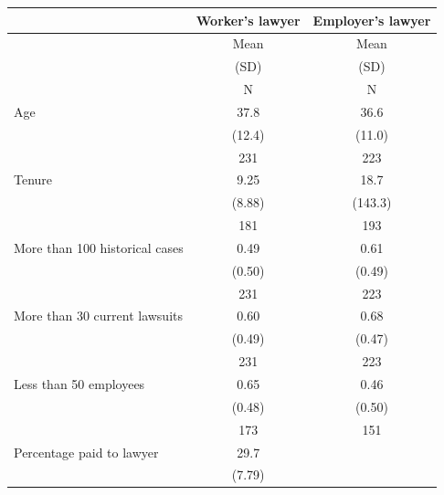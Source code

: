 \begin{tabular}{rrcccc}
\midrule
      &       & \multicolumn{2}{c}{Worker's lawyer} & \multicolumn{2}{c}{Employer's lawyer} \\
\midrule
      &       & \multicolumn{2}{c}{Mean} & \multicolumn{2}{c}{Mean} \\
      &       & \multicolumn{2}{c}{(SD)} & \multicolumn{2}{c}{(SD)} \\
\multicolumn{2}{r}{} & \multicolumn{2}{c}{N} & \multicolumn{2}{c}{N} \\
\midrule
\multicolumn{2}{l}{Age} & \multicolumn{2}{c}{37.8} & \multicolumn{2}{c}{36.6} \\
\multicolumn{2}{r}{} & \multicolumn{2}{c}{(12.4)} & \multicolumn{2}{c}{(11.0)} \\
\multicolumn{2}{r}{} & \multicolumn{2}{c}{231} & \multicolumn{2}{c}{223} \\
\multicolumn{2}{l}{Tenure} & \multicolumn{2}{c}{9.25} & \multicolumn{2}{c}{18.7} \\
\multicolumn{2}{r}{} & \multicolumn{2}{c}{(8.88)} & \multicolumn{2}{c}{(143.3)} \\
\multicolumn{2}{r}{} & \multicolumn{2}{c}{181} & \multicolumn{2}{c}{193} \\
\multicolumn{2}{l}{More than 100 historical cases} & \multicolumn{2}{c}{0.49} & \multicolumn{2}{c}{0.61} \\
\multicolumn{2}{r}{} & \multicolumn{2}{c}{(0.50)} & \multicolumn{2}{c}{(0.49)} \\
\multicolumn{2}{r}{} & \multicolumn{2}{c}{231} & \multicolumn{2}{c}{223} \\
\multicolumn{2}{l}{More than 30 current lawsuits} & \multicolumn{2}{c}{0.60} & \multicolumn{2}{c}{0.68} \\
\multicolumn{2}{r}{} & \multicolumn{2}{c}{(0.49)} & \multicolumn{2}{c}{(0.47)} \\
\multicolumn{2}{r}{} & \multicolumn{2}{c}{231} & \multicolumn{2}{c}{223} \\
\multicolumn{2}{l}{Less than 50 employees} & \multicolumn{2}{c}{0.65} & \multicolumn{2}{c}{0.46} \\
\multicolumn{2}{r}{} & \multicolumn{2}{c}{(0.48)} & \multicolumn{2}{c}{(0.50)} \\
\multicolumn{2}{r}{} & \multicolumn{2}{c}{173} & \multicolumn{2}{c}{151} \\
\multicolumn{2}{l}{Percentage paid to lawyer} & \multicolumn{2}{c}{29.7} & \multicolumn{2}{c}{} \\
\multicolumn{2}{r}{} & \multicolumn{2}{c}{(7.79)} & \multicolumn{2}{c}{} \\

\end{tabular}
